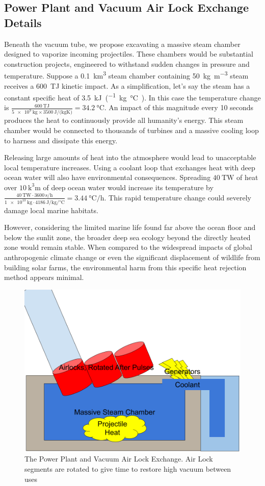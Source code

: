 \documentclass{article}
\begin{document}
\subsection{Power Plant and Vacuum Air Lock Exchange Details}
Beneath the vacuum tube, we propose excavating a massive steam chamber designed to vaporize incoming projectiles. These chambers would be substantial construction projects, engineered to withstand sudden changes in pressure and temperature.  Suppose a \SI{0.1}{\cubic\kilo\meter} steam chamber containing \SI{50}{\kilo\gram\per\cubic\meter} steam receives a \SI{600}{\tera\joule} kinetic impact.   As a simplification, let's say the steam has a constant specific heat of \SI{3.5}{\kilo\joule\per(\kilo\gram\celsius)}.  In this case the temperature change is 
$\frac{\SI{600}{\tera\joule}}{\SI{5e9}{\kilo\gram}\times\SI{3500}{\joule\per(\kilo\gram\kelvin)}} = \SI{34.2}{\celsius}$.  An impact of this magnitude every 10 seconds produces the heat to continuously provide all humanity's energy.  This steam chamber would be connected to thousands of turbines and a massive cooling loop to harness and dissipate this energy.  

Releasing large amounts of heat into the atmosphere would lead to unacceptable local temperature increases. Using a coolant loop that exchanges heat with deep ocean water will also have environmental consequences. Spreading $\SI{40}{\tera\watt}$ of heat over $\SI{10}{\cubic\kilo\meter}$ of deep ocean water would increase its temperature by $\frac{\SI{40}{\tera\watt}\cdot\SI{3600}{\second\per\hour}}{\SI{1e13}{\kilo\gram}\cdot\SI{4186}{\joule\per\kilo\gram\per\celsius}} = \SI{3.44}{\celsius\per\hour}$.  This rapid temperature change could severely damage local marine habitats.

However, considering the limited marine life found far above the ocean floor and below the sunlit zone, the broader deep sea ecology beyond the directly heated zone would remain stable. When compared to the widespread impacts of global anthropogenic climate change or even the significant displacement of wildlife from building solar farms, the environmental harm from this specific heat rejection method appears minimal.


\begin{figure}[htpb]
    \centering
    \includegraphics[width=0.5\linewidth]{images/Power Plant Cooling and Generators.png}
    \caption{The Power Plant and Vacuum Air Lock Exchange.  Air Lock segments are rotated to give time to restore high vacuum between uses}
    \label{fig:power_plant_vacuum_exchange}
\end{figure}
\end{document}
